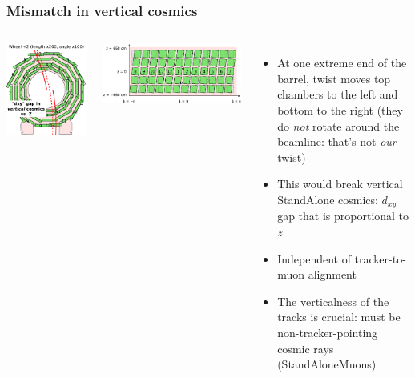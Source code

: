 \documentclass[compress]{beamer}
\begin{document}
\begin{frame}
\frametitle{Mismatch in vertical cosmics}
\begin{columns}
\includegraphics[width=\linewidth]{twist.pdf}

\vspace{0.5 cm}
\includegraphics[width=\linewidth]{twist_station.pdf}

\begin{itemize}
\item At one extreme end of the barrel, twist moves top chambers to
  the left and bottom to the right (they do {\it not} rotate around
  the beamline: that's not {\it our} twist)
\item This would break vertical StandAlone cosmics: $d_{xy}$ gap that
  is proportional to $z$
\item Independent of tracker-to-muon alignment
\item The verticalness of the tracks is crucial: must be
  non-tracker-pointing cosmic rays (StandAloneMuons)
\end{itemize}
\end{columns}
\end{frame}
\end{document}
